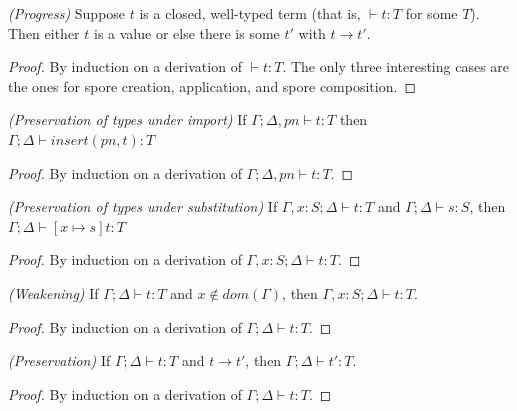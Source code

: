 \documentclass[runningheads]{llncs}
\begin{document}
\begin{sloppypar}


\begin{theorem}
\emph{(Progress)}
\label{th:progress}
Suppose $t$ is a closed, well-typed term (that is, $\vdash t : T$ for some $T$). Then either $t$ is a value or else there is some $t'$ with $t \rightarrow t'$.
\vspace{-2.5mm}
\end{theorem}
\begin{proof}
By induction on a derivation of $\vdash t : T$. The only three interesting cases are the ones for spore creation, application, and spore composition.
\end{proof}


\begin{lemma}
\emph{(Preservation of types under import)}
\label{lem:pres-import}
If $\Gamma ; \Delta, pn \vdash t : T$ then $\Gamma ; \Delta \vdash insert(pn, t) : T$
\vspace{-2.5mm}
\end{lemma}
\begin{proof}
By induction on a derivation of $\Gamma ; \Delta, pn \vdash t : T$.
\end{proof}


\begin{lemma}
\emph{(Preservation of types under substitution)}
\label{lem:substitution}
If $\Gamma, x : S ; \Delta \vdash t : T$ and $\Gamma ; \Delta \vdash s : S$, then $\Gamma ; \Delta \vdash [x \mapsto s]t : T$
\vspace{-2.5mm}
\end{lemma}
\begin{proof}
By induction on a derivation of $\Gamma, x : S ; \Delta \vdash t : T$.
\end{proof}


\begin{lemma}
\emph{(Weakening)}
\label{lem:weak}
If $\Gamma ; \Delta \vdash t : T$ and $x \notin dom(\Gamma)$, then $\Gamma, x : S ; \Delta \vdash t : T$.
\vspace{-2.5mm}
\end{lemma}
\begin{proof}
By induction on a derivation of $\Gamma ; \Delta \vdash t : T$.
\end{proof}


\begin{theorem}
\emph{(Preservation)}
\label{th:pres}
If $\Gamma ; \Delta \vdash t : T$ and $t \rightarrow t'$, then $\Gamma ; \Delta \vdash t' : T$.
\vspace{-2.5mm}
\end{theorem}
\begin{proof}
By induction on a derivation of $\Gamma ; \Delta \vdash t : T$.
\end{proof}



\end{sloppypar}
\end{document}
